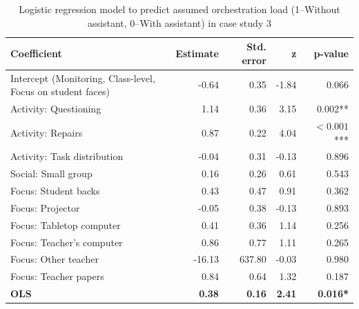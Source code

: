 \documentclass[10pt,journal,compsoc]{IEEEtran}
\begin{document}
\begin{table}[!t]
\caption{Logistic regression model to predict assumed orchestration load (1--Without assistant, 0--With assistant) in case study 3}
\label{tab:case3results}
\centering
\begin{tabular}{|p{2.7cm}||r|r|r|r|}
\hline
Coefficient & Estimate & Std. error & z & p-value\\
\hline
\hline
Intercept (Monitoring, Class-level, Focus on student faces) & -0.64 & 0.35 & -1.84 & 0.066 \\ 
Activity: Questioning & 1.14 & 0.36 & 3.15 & 0.002** \\ 
Activity: Repairs & 0.87 & 0.22 & 4.04 & $<0.001$*** \\ 
Activity: Task distribution & -0.04 & 0.31 & -0.13 & 0.896 \\ 
Social: Small group & 0.16 & 0.26 & 0.61 & 0.543 \\ 
Focus: Student backs & 0.43 & 0.47 & 0.91 & 0.362 \\ 
Focus: Projector & -0.05 & 0.38 & -0.13 & 0.893 \\ 
Focus: Tabletop computer & 0.41 & 0.36 & 1.14 & 0.256 \\ 
Focus: Teacher's computer & 0.86 & 0.77 & 1.11 & 0.265 \\ 
Focus: Other teacher & -16.13 & 637.80 & -0.03 & 0.980 \\ 
Focus: Teacher papers & 0.84 & 0.64 & 1.32 & 0.187 \\ 
\textbf{OLS} & \textbf{0.38} & \textbf{0.16} & \textbf{2.41} & \textbf{0.016*} \\
\hline
\end{tabular}
\end{table}
\end{document}
